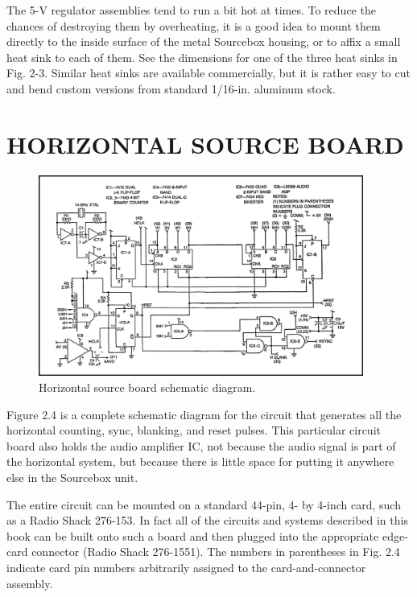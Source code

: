 \documentclass[11pt]{book}              %
\begin{document}
The 5-V regulator assemblies tend to run a bit hot at times. To reduce the chances of destroying them by overheating, it is a good idea to mount them directly to the inside surface of the metal Sourcebox housing, or to affix a small heat sink to each of them. See the dimensions for one of the three heat sinks in Fig. 2-3. Similar heat sinks are available commercially, but it is rather easy to cut and bend custom versions from standard 1/16-in. aluminum stock.


\section{HORIZONTAL SOURCE BOARD}

\begin{figure}
    \centering
    \includegraphics[width=0.95\textwidth]{images/fig2-4}
    \caption{Horizontal source board schematic diagram.}
\end{figure}

Figure 2.4 is a complete schematic diagram for the circuit that generates all the horizontal counting, sync, blanking, and reset pulses. This particular circuit board also holds the audio amplifier IC, not because the audio signal is part of the horizontal system, but because there is little space for putting it anywhere else in the Sourcebox unit.

The entire circuit can be mounted on a standard 44-pin, 4- by 4-inch card, such as a Radio Shack 276-153. In fact all of the circuits and systems described in this book can be built onto such a board and then plugged into the appropriate edge-card connector (Radio Shack 276-1551). The numbers in parentheses in Fig. 2.4 indicate card pin numbers arbitrarily assigned to the card-and-connector assembly.
\end{document}
